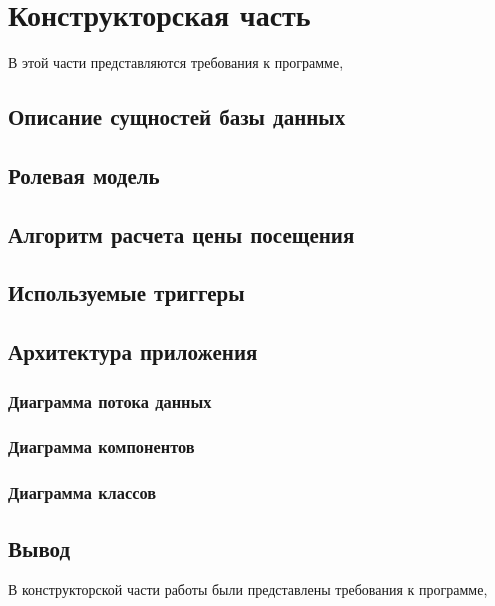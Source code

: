 \chapter{Конструкторская часть}

В этой части представляются требования к программе,

\section{Описание сущностей базы данных}

\section{Ролевая модель}

\section{Алгоритм расчета цены посещения}

\section{Используемые триггеры}

\section{Архитектура приложения}

\subsection{Диаграмма потока данных}

\subsection{Диаграмма компонентов}

\subsection{Диаграмма классов}


\section{Вывод}

В конструкторской части работы были представлены требования к программе, 

\clearpage
